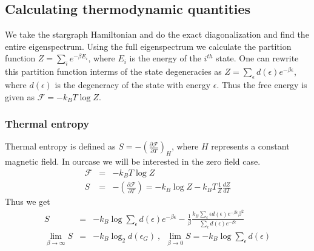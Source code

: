 \documentclass[reprint,prb,superscriptaddress]{revtex4-1}
\begin{document}
\subsection{Calculating thermodynamic quantities}
We take the stargraph Hamiltonian and do the exact diagonalization and find the entire eigenspectrum. Using the full eigenspectrum we calculate the partition function $Z=\sum_i e^{-\beta E_i}$, where $E_i$ is the energy of the $i^{th}$ state. One can rewrite this partition function interms of the state degeneracies as $Z=\sum_{\epsilon} d(\epsilon) e^{-\beta \epsilon} $, where $d(\epsilon)$ is the degeneracy of the state with energy $\epsilon$. Thus the free energy is given as $\mathcal{F}=-k_BT\log Z$. 
\subsubsection{Thermal entropy}
Thermal entropy is defined as $S=-(\frac{\partial \mathcal{F}}{\partial T})_H$, where $H$ represents a constant magnetic field. In ourcase we will be interested in the zero field case. 
\begin{eqnarray}
\mathcal{F}&=& -k_B T\log Z \nonumber\\
S &=& -(\frac{\partial \mathcal{F}}{\partial T}) = -k_B \log Z -k_B T \frac{1}{Z} \frac{dZ}{dT}
\end{eqnarray}
Thus we get
\begin{eqnarray}
S &=& -k_B \log \sum_{\epsilon} d(\epsilon) e^{-\beta \epsilon}  -\frac{1}{\beta} \frac{k_B\sum_\epsilon \epsilon d(\epsilon) e^{-\beta \epsilon} \beta^2   }{\sum_\epsilon  d(\epsilon)e^{-\beta \epsilon}} \nonumber\\
\lim_{\beta\rightarrow \infty} S &=& -k_B \log_2 d(\epsilon_{G})~,~~\lim_{\beta\rightarrow 0} S = -k_B \log \sum_\epsilon d(\epsilon)  \nonumber
\end{eqnarray}
\end{document}
